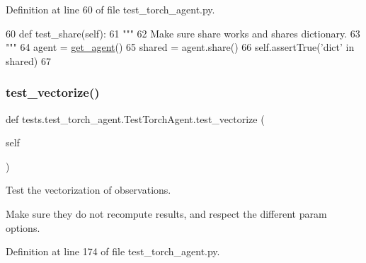 Definition at line 60 of file test\+\_\+torch\+\_\+agent.\+py.


\begin{DoxyCode}
60     \textcolor{keyword}{def }test\_share(self):
61         \textcolor{stringliteral}{"""}
62 \textcolor{stringliteral}{        Make sure share works and shares dictionary.}
63 \textcolor{stringliteral}{        """}
64         agent = \hyperlink{namespacetests_1_1test__torch__agent_ae929d109305aaea29fbfa13ecf1f32e9}{get\_agent}()
65         shared = agent.share()
66         self.assertTrue(\textcolor{stringliteral}{'dict'} \textcolor{keywordflow}{in} shared)
67 
\end{DoxyCode}
\mbox{\label{classtests_1_1test__torch__agent_1_1TestTorchAgent_a551847086a9d8bf6bc04ea1efeacf608}} 
\subsubsection{\texorpdfstring{test\+\_\+vectorize()}{test\_vectorize()}}
{\footnotesize\ttfamily def tests.\+test\+\_\+torch\+\_\+agent.\+Test\+Torch\+Agent.\+test\+\_\+vectorize (\begin{DoxyParamCaption}\item[{}]{self }\end{DoxyParamCaption})}

\begin{DoxyVerb}Test the vectorization of observations.

Make sure they do not recompute results, and respect the different param
options.
\end{DoxyVerb}
 

Definition at line 174 of file test\+\_\+torch\+\_\+agent.\+py.


